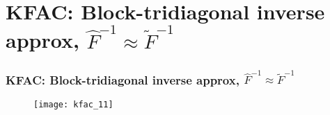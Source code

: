 \section{KFAC: Block-tridiagonal inverse approx, $\hat{F}^{-1} \approx \tilde{F}^{-1}$}

\begin{frame}
\frametitle{KFAC: Block-tridiagonal inverse approx, $\hat{F}^{-1} \approx \tilde{F}^{-1}$}
\begin{figure}
    \centering
    \texttt{[image: kfac\_11]}
\end{figure}
\end{frame}


